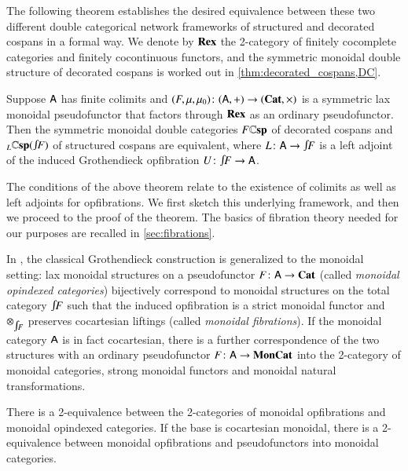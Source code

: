 \documentclass[reqno]{amsart}
\begin{document}
The following theorem establishes the desired equivalence between these two different double categorical network frameworks of structured and decorated cospans in a formal way. We denote by $\mathbf{Rex}$ the 2-category of finitely cocomplete categories and finitely cocontinuous functors, and the symmetric monoidal double structure of decorated cospans is worked out in \cref{thm:decorated_cospans,DC}.

\begin{thm} \label{thm:equiv}
Suppose $\mathsf{A}$ has finite colimits and $(F,\mu,\mu_0)\colon(\mathsf{A},+) \to (\mathbf{Cat},\times)$ is a symmetric lax monoidal pseudofunctor that factors through $\mathbf{Rex}$ as an ordinary pseudofunctor. 
Then the symmetric monoidal double categories $F\mathbf{\mathbb Csp}$ of decorated cospans and $_L\lCsp(\inta F)$ of structured cospans are equivalent, where $L \maps \A \to \inta F$ is a left adjoint of the induced Grothendieck opfibration $\U\maps \inta F \to \A$.
\end{thm}

The conditions of the above theorem relate to the existence of colimits as well as left adjoints for opfibrations. We first sketch this underlying framework, and then we proceed to the proof of the theorem. The basics of fibration theory needed for our purposes are recalled in \cref{sec:fibrations}. 

In \cite{MV}, the classical Grothendieck construction is generalized to the monoidal setting: lax monoidal structures on a pseudofunctor $F\colon\mathsf{A}\to\mathbf{Cat}$ (called \emph{monoidal opindexed categories}) bijectively correspond to monoidal structures on the total category $\inta F$ such that the induced opfibration is a strict monoidal functor and $\otimes_{\inta F}$ preserves cocartesian liftings (called \emph{monoidal fibrations}). If the monoidal category $\mathsf{A}$ is in fact cocartesian, there is a further correspondence of the two structures with an ordinary pseudofunctor $F\colon\mathsf{A}\to\mathbf{MonCat}$ into the 2-category of monoidal categories, strong monoidal functors and monoidal natural transformations.

\begin{lem}\label{lem:MonGroth}
 There is a 2-equivalence between the 2-categories of monoidal opfibrations and monoidal opindexed categories. If the base is cocartesian monoidal, there is a 2-equivalence between monoidal opfibrations and pseudofunctors into monoidal categories. 
\end{lem}
\end{document}
